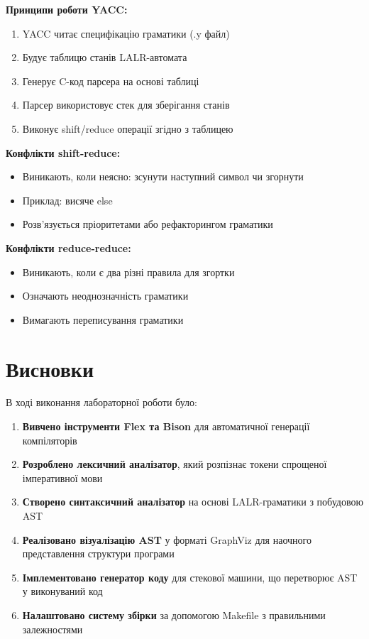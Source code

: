 \documentclass[12pt,a4paper]{article}
\begin{document}
\textbf{Принципи роботи YACC:}
\begin{enumerate}
    \item YACC читає специфікацію граматики (.y файл)
    \item Будує таблицю станів LALR-автомата
    \item Генерує C-код парсера на основі таблиці
    \item Парсер використовує стек для зберігання станів
    \item Виконує shift/reduce операції згідно з таблицею
\end{enumerate}

\textbf{Конфлікти shift-reduce:}
\begin{itemize}
    \item Виникають, коли неясно: зсунути наступний символ чи згорнути
    \item Приклад: висяче else
    \item Розв'язується пріоритетами або рефакторингом граматики
\end{itemize}

\textbf{Конфлікти reduce-reduce:}
\begin{itemize}
    \item Виникають, коли є два різні правила для згортки
    \item Означають неоднозначність граматики
    \item Вимагають переписування граматики
\end{itemize}

\section{Висновки}

В ході виконання лабораторної роботи було:

\begin{enumerate}
    \item \textbf{Вивчено інструменти Flex та Bison} для автоматичної генерації компіляторів
    
    \item \textbf{Розроблено лексичний аналізатор}, який розпізнає токени спрощеної імперативної мови
    
    \item \textbf{Створено синтаксичний аналізатор} на основі LALR-граматики з побудовою AST
    
    \item \textbf{Реалізовано візуалізацію AST} у форматі GraphViz для наочного представлення структури програми
    
    \item \textbf{Імплементовано генератор коду} для стекової машини, що перетворює AST у виконуваний код
    
    \item \textbf{Налаштовано систему збірки} за допомогою Makefile з правильними залежностями
\end{enumerate}
\end{document}
